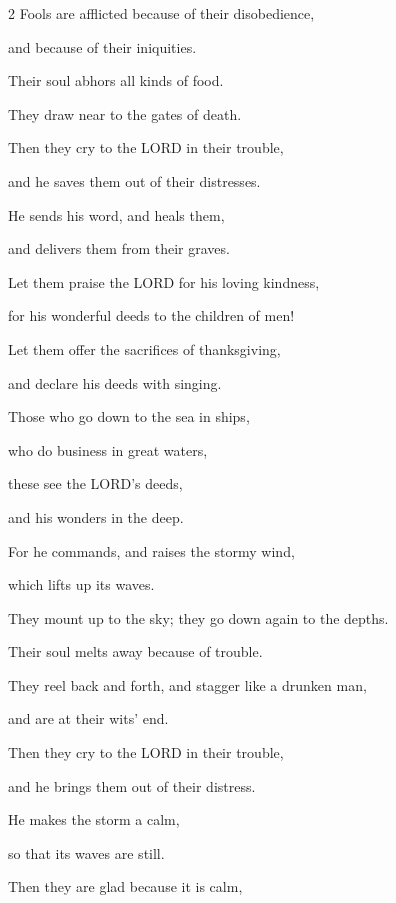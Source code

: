 \begin{multicols}{2}
	\myverse{}Fools are afflicted because of their disobedience,
	
	and because of their iniquities.
	
	
	\myverse{}Their soul abhors all kinds of food.
	
	They draw near to the gates of death.
	
	
	\myverse{}Then they cry to the LORD in their trouble,
	
	and he saves them out of their distresses.
	
	
	\myverse{}He sends his word, and heals them,
	
	and delivers them from their graves.
	
	
	\myverse{}Let them praise the LORD for his loving kindness,
	
	for his wonderful deeds to the children of men!
	
	\vspace{\baselineskip}
	
	\myverse{}Let them offer the sacrifices of thanksgiving,
	
	and declare his deeds with singing.
	
	\vspace{\baselineskip}
	
	\myverse{}Those who go down to the sea in ships,
	
	who do business in great waters,
	
	
	\myverse{}these see the LORD’s deeds,
	
	and his wonders in the deep.
	
	
	\myverse{}For he commands, and raises the stormy wind,
	
	which lifts up its waves.
	
	
	\myverse{}They mount up to the sky; they go down again to the depths.
	
	Their soul melts away because of trouble.
	
	
	\myverse{}They reel back and forth, and stagger like a drunken man,
	
	and are at their wits’ end.
	
	
	\myverse{}Then they cry to the LORD in their trouble,
	
	and he brings them out of their distress.
	
	
	\myverse{}He makes the storm a calm,
	
	so that its waves are still.
	
	
	\myverse{}Then they are glad because it is calm,
	

\end{multicols}
